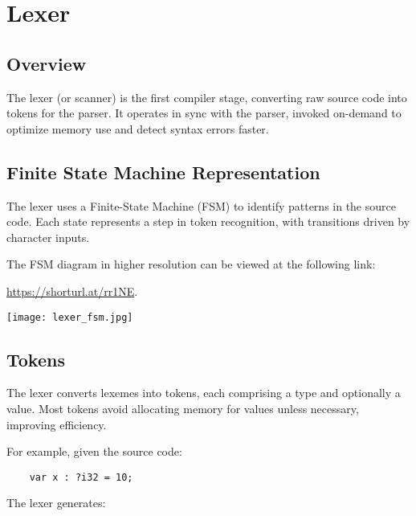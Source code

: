 \documentclass[12pt,a4paper]{article}
\begin{document}
\section{Lexer}

\subsection{Overview}
The lexer (or scanner) is the first compiler stage, converting raw source code into tokens for the parser. It operates in sync with the parser, invoked on-demand to optimize memory use and detect syntax errors faster.

\subsection{Finite State Machine Representation}
The lexer uses a Finite-State Machine (FSM) to identify patterns in the source code. Each state represents a step in token recognition, with transitions driven by character inputs.

The FSM diagram in higher resolution can be viewed at the following link:  

\href{https://shorturl.at/rr1NE}{https://shorturl.at/rr1NE}.

\begin{center}
    \texttt{[image: lexer\_fsm.jpg]} %
\end{center}

\subsection{Tokens}
The lexer converts lexemes into tokens, each comprising a type and optionally a value. Most tokens avoid allocating memory for values unless necessary, improving efficiency.

For example, given the source code:
\begin{verbatim}
    var x : ?i32 = 10;
\end{verbatim}

The lexer generates:
\end{document}
